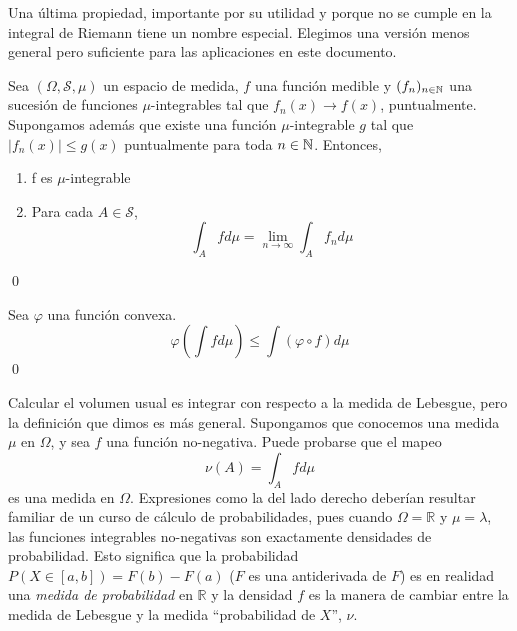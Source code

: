 \documentclass[main.tex]{subfiles}
\begin{document}
Una última propiedad, importante por su utilidad y porque no se cumple en la integral de Riemann tiene un nombre especial. Elegimos una versión menos general pero suficiente para las aplicaciones en este documento.

\begin{theorem}
	Sea $(\Omega, \mathcal{S}, \mu)$ un espacio de medida, $f$ una función medible y $(f_n)_{n\in\operatorname{\mathbb{N}}}$ una sucesión de funciones $\mu$-integrables tal que $f_n(x) \rightarrow f(x)$, puntualmente. Supongamos además que existe una función $\mu$-integrable $g$ tal que $\mid f_n(x)\mid \leq g(x)$ puntualmente para toda $n\in\operatorname{\mathbb{N}}$. Entonces,
	\begin{enumerate}[label=\roman*.]
		\item f es $\mu$-integrable
		\item Para cada $A\in\mathcal{S}$,
		\begin{equation*}
			\int_A f d\mu = \lim_{n\rightarrow\infty}\int_A f_n d\mu 
		\end{equation*}
	\end{enumerate}
	\qed
\end{theorem}

\begin{prop}\label{thm:jensen}
Sea $\varphi$ una función convexa.
\begin{equation*}
			\varphi\left(\int fd\mu \right) \leq \int\left(\varphi\circ f\right)d\mu
\end{equation*}
\qed
\end{prop}


Calcular el volumen usual es integrar con respecto a la medida de Lebesgue, pero la definición que dimos es más general. Supongamos que conocemos una medida $\mu$ en $\Omega$, y sea $f$ una función no-negativa. Puede probarse que el mapeo
\begin{equation*}
	\nu(A)=\int_Afd\mu 
\end{equation*} 
es una medida en $\Omega$. Expresiones como la del lado derecho deberían resultar familiar de un curso de cálculo de probabilidades, pues cuando $\Omega=\mathbb{R}$ y $\mu=\lambda$, las funciones integrables no-negativas son exactamente densidades de probabilidad. Esto significa que la probabilidad $P(X\in [a,b])=F(b)-F(a)$ ($F$ es una antiderivada de $F$) es en realidad una \textit{medida de probabilidad} en $\mathbb{R}$ y la densidad $f$ es la manera de cambiar entre la medida de Lebesgue y la medida \enquote{probabilidad de $X$}, $\nu$. 
\end{document}
